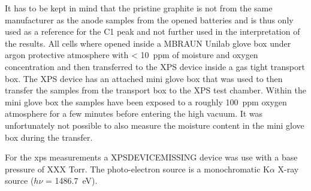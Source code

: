 It has to be kept in mind that the pristine graphite is not from the same manufacturer as the anode samples from the opened batteries and is thus only used as a reference for the C1 peak and not further used in the interpretation of the results. All cells where opened inside a MBRAUN Unilab glove box under argon protective atmosphere with < \SI{10}{ppm} of moisture and oxygen concentration and then transferred to the XPS device inside a gas tight transport box. The XPS device has an attached mini glove box that was used to then transfer the samples from the transport box to the XPS test chamber. Within the mini glove box the samples have been exposed to a roughly \SI{100}{ppm} oxygen atmosphere for a few minutes before entering the high vacuum. It was unfortunately not possible to also measure the moisture content in the mini glove box during the transfer.  \par
For the \gls{xps} measurements a XPSDEVICEMISSING device was use with a base pressure of XXX Torr. The photo-electron source is a monochromatic  K$\alpha$ X-ray source ($h\nu$ = \SI{1486.7}{\electronvolt}).

